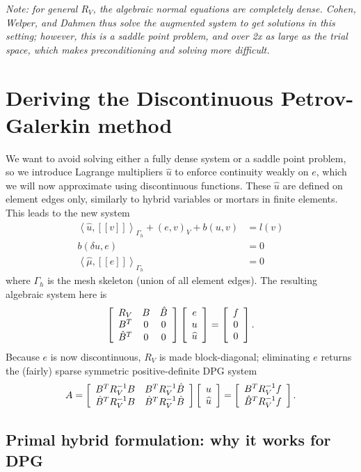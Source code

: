 \documentclass{article}
\newcommand{\LRs}[1]{\left[ #1 \right]}
\newcommand{\LRa}[1]{\left\langle #1 \right\rangle}
\newcommand{\jump}[1] {\ensuremath{\LRs{\![#1]\!}}}
\newcommand{\uh}{\widehat{u}}
\newcommand{\Gh}{\Gamma_h}
\def\vecttwo#1#2{\left[
\begin{array}{c}
#1\\
#2\\
\end{array}
\right]}
\begin{document}
\emph{Note: for general $R_V$, the algebraic normal equations are completely dense.  Cohen, Welper, and Dahmen thus solve the augmented system to get solutions in this setting; however, this is a saddle point problem, and over 2x as large as the trial space, which makes preconditioning and solving more difficult. }

\section{Deriving the Discontinuous Petrov-Galerkin method}

We want to avoid solving either a fully dense system or a saddle point problem, so we introduce Lagrange multipliers $\uh$ to enforce continuity weakly on $e$, which we will now approximate using discontinuous functions.  These $\uh$ are defined on element edges only, similarly to hybrid variables or mortars in finite elements.  This leads to the new system 
\begin{align*}
\LRa{\uh, \jump{v}}_{\Gh} + (e,v)_V + b(u,v) &= l(v) \\
b(\delta u,e) &= 0\\
\LRa{\hat{\mu}, \jump{e}}_{\Gh} &= 0
\end{align*}
where $\Gh$ is the mesh skeleton (union of all element edges).  The resulting algebraic system here is 
\[
\left[
\begin{array}{c c c}
R_V & B& \hat{B}\\
B^T & 0& 0\\
\hat{B}^T & 0& 0
\end{array}
\right]
\left[\begin{array}{c}
e \\ u\\ \uh
\end{array}
\right]
= 
\left[\begin{array}{c}
f\\0\\0
\end{array}
\right].
\]
Because $e$ is now discontinuous, $R_V$ is made block-diagonal; eliminating $e$ returns the (fairly) sparse symmetric positive-definite DPG system
\[
A = \left[\begin{array}{c c}
B^TR_V^{-1}B & B^TR_V^{-1}\hat{B}\\
\hat{B}^TR_V^{-1}B & \hat{B}^TR_V^{-1}\hat{B}
\end{array}\right]
\vecttwo{u}{\uh} = \vecttwo{B^TR_V^{-1} f}{\hat{B}^TR_V^{-1}f}.
\]

\subsection{Primal hybrid formulation: why it works for DPG}
\end{document}
